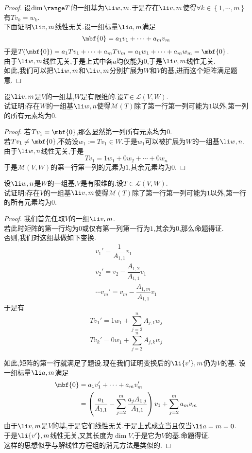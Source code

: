 \documentclass{ctexart}
\begin{document}
\begin{proof}
    设$\dim\range T$的一组基为$\li w,m$.于是存在$\li v,m$使得$\forall k\in\left\{1,\cdots,m\right\}$有$Tv_k=w_k$.\\
    下面证明$\li v,m$线性无关.设一组标量$\li a,m$满足
    $$\mbf{0}=a_1v_1+\cdots+a_mv_m$$
    于是$T(\mbf{0})=a_1Tv_1+\cdots+a_mTv_m=a_1w_1+\cdots+a_mw_m=\mbf{0}$.\\
    由于$\li w,m$线性无关,于是上式中各$a$均仅能为$0$,于是$\li v,m$线性无关.\\
    如此,我们可以把$\li w,m$和$\li v,m$分别扩展为$W$和$V$的基,进而这个矩阵满足题意.
\end{proof}
\begin{problem}[6.]
    设$\li v,m$是$V$的一组基,$W$是有限维的.设$T\in\mathcal{L}(V,W)$.\\
    试证明:存在$W$的一组基$\li w,n$使得$\mathcal{M}(T)$除了第一行第一列可能为$1$以外,第一列的所有元素均为$0$.
\end{problem}
\begin{proof}
    若$Tv_1=\mbf{0}$,那么显然第一列所有元素均为$0$.\\
    若$Tv_1\neq\mbf{0}$,不妨设$w_1:=Tv_1\in W$.于是$w_1$可以被扩展为$W$的一组基$\li w,n$.由于$\li w,n$线性无关,于是
    $$Tv_1=1w_1+0w_2+\cdots+0w_n$$
    于是$\mathcal{M}(V,W)$的第一行第一列的元素为$1$,其余元素均为$0$.
\end{proof}
\begin{problem}[7.]
    设$\li w,n$是$W$的一组基,$V$是有限维的.设$T\in\mathcal{L}(V,W)$.\\
    试证明:存在$V$的一组基$\li v,m$使得$\mathcal{M}(T)$除了第一行第一列可能为$1$以外,第一行的所有元素均为$0$.
\end{problem}
\begin{proof}
    我们首先任取$V$的一组$\li v,m$.\\
    若此时矩阵的第一行均为$0$或仅有第一列第一行为$1$,其余为$0$,那么命题得证.\\
    否则,我们对这组基做如下变换.
    $$\begin{aligned}
        v_1'=\dfrac{1}{A_{1,1}}v_1\\
        v_2'=v_2-\dfrac{A_{1,2}}{A_{1,1}}v_1\\
        \cdots
        v_m'=v_m-\dfrac{A_{1,m}}{A_{1,1}}v_1
    \end{aligned}$$
    于是有
    $$Tv_1'=1w_1+\sum_{j=2}^{n}A_{j,1}w_j$$
    $$Tv_k'=0w_1+\sum_{j=2}^{n}A_{j,k}w_j$$
    
    如此,矩阵的第一行就满足了题设.现在我们证明变换后的$\li {v'},m$仍为$V$的基.
    设一组标量$\li a,m$满足
    $$\begin{aligned}
        \mbf{0}
        &= a_1v_1'+\cdots+a_mv_m'\\
        &= \left(\dfrac{a_1}{A_{1,1}}-\sum_{j=2}^{m}\dfrac{a_jA_{1,j}}{A_{1,1}}\right)v_1+\sum_{j=2}^{m}a_mv_m
    \end{aligned}$$
    由于$\li v,m$是$V$的基,于是它们线性无关.于是上式成立当且仅当$\li a=m=0$.\\
    于是$\li {v'},m$线性无关,又其长度为$\dim V$,于是它为$V$的基.命题得证.\\
    这样的思想似乎与解线性方程组的消元方法是类似的.
\end{proof}
\end{document}
